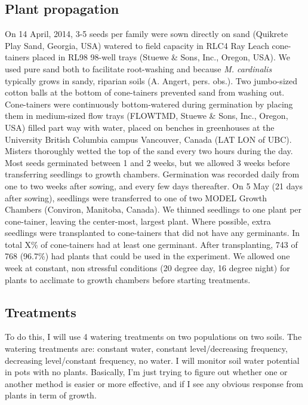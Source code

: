 \documentclass[11pt, oneside]{article}
\begin{document}
\subsection*{Plant propagation}

On 14 April, 2014, 3-5 seeds per family were sown directly on sand (Quikrete Play Sand, Georgia, USA) watered to field capacity in RLC4 Ray Leach cone-tainers placed in RL98 98-well trays (Stuewe \& Sons, Inc., Oregon, USA). We used pure sand both to facilitate root-washing and because \textit{M. cardinalis} typically grows in sandy, riparian soils (A. Angert, pers. obs.). Two jumbo-sized cotton balls at the bottom of cone-tainers prevented sand from washing out. Cone-tainers were continuously bottom-watered during germination by placing them in medium-sized flow trays (FLOWTMD, Stuewe \& Sons, Inc., Oregon, USA) filled part way with water, placed on benches in greenhouses at the University British Columbia campus Vancouver, Canada (LAT LON of UBC). Misters thoroughly wetted the top of the sand every two hours during the day. Most seeds germinated between 1 and 2 weeks, but we allowed 3 weeks before transferring seedlings to growth chambers. Germination was recorded daily from one to two weeks after sowing, and every few days thereafter. On 5 May (21 days after sowing), seedlings were transferred to one of two MODEL Growth Chambers (Conviron, Manitoba, Canada). We thinned seedlings to one plant per cone-tainer, leaving the center-most, largest plant. Where possible, extra seedlings were transplanted to cone-tainers that did not have any germinants. In total X\% of cone-tainers had at least one germinant. After transplanting, 743 of 768 (96.7\%) had plants that could be used in the experiment. We allowed one week at constant, non stressful conditions (20 degree day, 16 degree night) for plants to acclimate to growth chambers before starting treatments.

\subsection*{Treatments}

To do this, I will use 4 watering treatments on two populations on two soils. The watering treatments are: constant water, constant level/decreasing frequency, decreasing level/constant frequency, no water. I will monitor soil water potential in pots with no plants. Basically, I'm just trying to figure out whether one or another method is easier or more effective, and if I see any obvious response from plants in term of growth.
\end{document}
